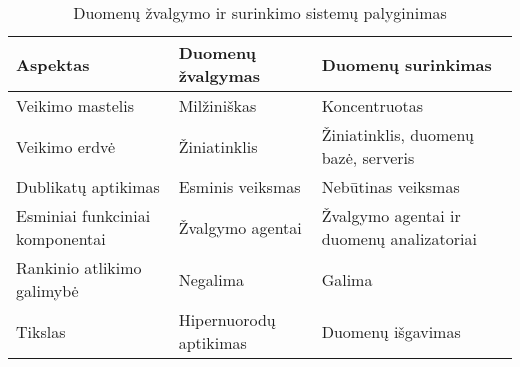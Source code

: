 \begin{table}[htbp]
  \centering
  \caption{Duomenų žvalgymo ir surinkimo sistemų palyginimas \cite{PromptCloudScrapingVsCrawling}}
    \begin{tabular}{|l|l|p{13.57em}|}
    \hline
    \textbf{Aspektas} & \textbf{Duomenų žvalgymas} & \textbf{Duomenų surinkimas} \bigstrut\\
    \hline
    Veikimo mastelis & Milžiniškas & Koncentruotas \bigstrut\\
    \hline
    Veikimo erdvė & Žiniatinklis & Žiniatinklis, duomenų bazė, serveris \bigstrut\\
    \hline
    Dublikatų aptikimas & Esminis veiksmas & Nebūtinas veiksmas \bigstrut\\
    \hline
    \multicolumn{1}{|p{12.285em}|}{Esminiai funkciniai komponentai} & Žvalgymo agentai & Žvalgymo agentai ir duomenų analizatoriai \bigstrut\\
    \hline
    Rankinio atlikimo galimybė & Negalima & Galima \bigstrut\\
    \hline
    Tikslas & Hipernuorodų aptikimas & Duomenų išgavimas \bigstrut\\
    \hline
    \end{tabular}%
  \label{tab:crawling_vs_scraping}%
\end{table}%